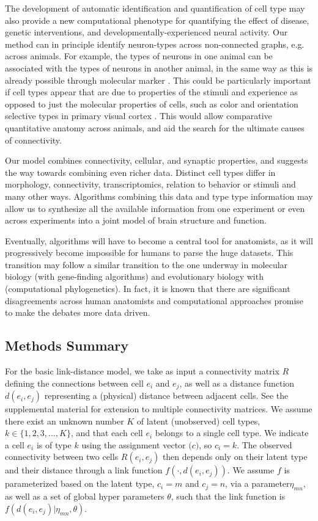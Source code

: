 \documentclass{article}
\renewcommand{\vec}[1]{\mathbf{#1}}
\begin{document}
The development of automatic identification and quantification of cell
type may also provide a new computational phenotype for quantifying
the effect of disease, genetic interventions, and
developmentally-experienced neural activity. Our method can in
principle identify neuron-types across non-connected graphs,
e.g. across animals. For example, the types of neurons in one animal
can be associated with the types of neurons in another animal, in the
same way as this is already possible through molecular marker
\autocite{Brown2009}. This could be particularly important if cell
types appear that are due to properties of the stimuli and experience
as opposed to just the molecular properties of cells, such as color
and orientation selective types in primary visual cortex
\autocite{Sincich2005,Lennie2005}. This would allow comparative
quantitative anatomy across animals, and aid the search for the
ultimate causes of connectivity.

Our model combines connectivity, cellular, and synaptic properties,
and suggests the way towards combining even richer data. Distinct cell
types differ in morphology, connectivity, transcriptomics, relation to
behavior or stimuli and many other ways. Algorithms combining this
data and type type information may allow us to synthesize all the
available information from one experiment or even across experiments
into a joint model of brain structure and function.

Eventually, algorithms will have to become a central tool for
anatomists, as it will progressively become impossible for humans to
parse the huge datasets. This transition may follow a similar
transition to the one underway in molecular biology (with gene-finding
algorithms) and evolutionary biology with (computational
phylogenetics).  In fact, it is known that there are significant
disagreements across human anatomists and computational approaches
promise to make the debates more data driven.


\subsection{Methods Summary}

For the basic link-distance model, we take as input a connectivity
matrix $R$ defining the connections between cell $e_i$ and $e_j$, as
well as a distance function $d(e_i, e_j)$ representing a (physical)
distance between adjacent cells.  See
the supplemental material for extension to multiple connectivity
matrices. We assume there exist an unknown number $K$ of latent
(unobserved) cell types, $k \in \{1, 2, 3, \dots, K\}$, and that each
cell $e_i$ belongs to a single cell type. We indicate a cell $e_i$ is
of type $k$ using the assignment vector $\vec(c)$, so $c_i = k$. The
observed connectivity between two cells $R(e_i, e_j)$ then depends
only on their latent type and their distance through a link function
$f(\cdot, d(e_i, e_j))$. We assume $f$ is parameterized based on the
latent type, $c_i=m$ and $c_j=n$, via a parameter$\eta_{mn}$, as well
as a set of global hyper parameters $\theta$, such that the link
function is $f(d(e_i, e_j) | \eta_{mn}, \theta)$.
\end{document}
